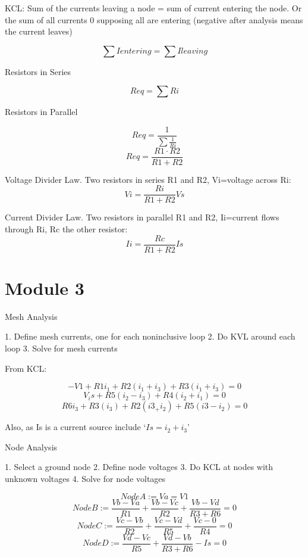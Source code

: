 \documentclass[]{article}
\begin{document}
KCL: Sum of the currents leaving a node = sum of current entering the node. Or the sum of all currents 0 supposing all are entering (negative after analysis means the current leaves)

$$\sum Ientering = \sum Ileaving$$

Resistors in Series

$$Req=\sum Ri$$

Resistors in Parallel

$$Req=\frac{1}{\sum\frac{1}{Ri}}$$
$$Req=\frac{R1\cdot R2}{R1+R2}$$

Voltage Divider Law. 
Two resistors in series R1 and R2, Vi=voltage across Ri:
$$Vi=\frac{Ri}{R1+R2}Vs$$

Current Divider Law. 
Two resistors in parallel R1 and R2, Ii=current flows through Ri, Rc the other resistor:
$$Ii=\frac{Rc}{R1+R2}Is$$
\section{Module 3}
Mesh Analysis

1. Define mesh currents, one for each noninclusive
loop
2. Do KVL around each loop
3. Solve for mesh currents


From KCL:

$$-V1+R1i_1 +R2(i_1+i_3)+R3(i_1+i_3)=0$$
$$V_is+R5(i_2-i_3)+R4(i_2+i_1)=0$$
$$R6i_3+R3(i_3)+R2(i3_+i_2)+R5(i3-i_2)=0$$

Also, as Is is a current source include `$Is=i_2+i_3$'

\newpage
Node Analysis

1. Select a ground node
2. Define node voltages
3. Do KCL at nodes with unknown voltages
4. Solve for node voltages

$$Node A := Va=V1$$
$$Node B := \frac{Vb-Va}{R1}+\frac{Vb-Vc}{R2} +\frac{Vb-Vd}{R3+R6}=0$$
$$Node C := \frac{Vc-Vb}{R2}+\frac{Vc-Vd}{R5} +\frac{Vc-0}{R4}=0$$
$$Node D := \frac{Vd-Vc}{R5}+\frac{Vd-Vb}{R3+R6} -Is=0$$
\end{document}
